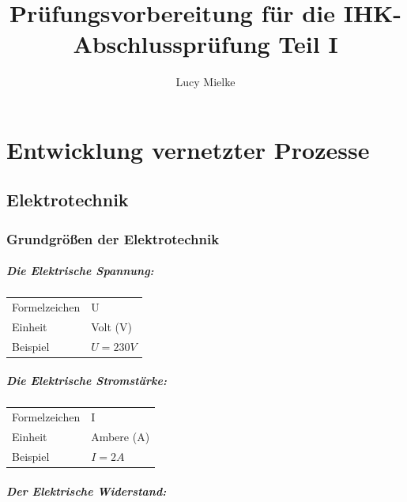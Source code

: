 \documentclass[a4paper, 12pt]{report}
\title{Prüfungsvorbereitung für die IHK-Abschlussprüfung Teil I}
\author{Lucy Mielke}
\begin{document}
\maketitle

\tableofcontents

\newpage
\chapter{Entwicklung vernetzter Prozesse}
\begin{multicols}{2}
\section{Elektrotechnik}
\subsection{Grundgrößen der Elektrotechnik}

\paragraph{Die Elektrische Spannung:}

\begin{center}
	\begin{tabular}{ ll }
		Formelzeichen & U            \\
		Einheit       & Volt (V)     \\
		Beispiel      & $U = 230V$ \\
	\end{tabular}
\end{center}

\paragraph{Die Elektrische Stromstärke:}

\begin{center}
	\begin{tabular}{ ll }
		Formelzeichen & I            \\
		Einheit       & Ambere (A)   \\
		Beispiel      & $I = 2A$    \\
	\end{tabular}
\end{center}

\paragraph{Der Elektrische Widerstand:}


\end{multicols}
\end{document}
